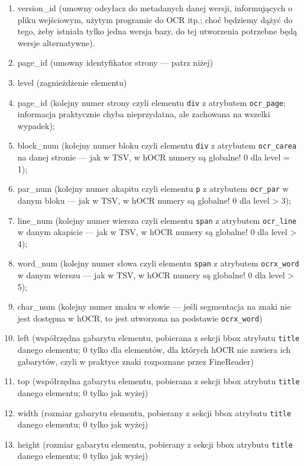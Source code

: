 \documentclass[12]{mwart}
\def\p#1{\textsf{#1}}
\def\f#1{\colorbox{black!15}{\textsf{#1}}}
\begin{document}
\begin{enumerate}
\item \f{version_id} (umowny odsyłacz do metadanych danej wersji,
  informujących o pliku wejściowym, użytym programie do OCR itp.; choć
  będziemy dążyć do tego, żeby istniała tylko jedna wersja bazy, do
  tej utworzenia potrzebne będą wersje alternatywne).
\item \f{page_id} (umowny identyfikator strony --- patrz niżej)
\item \f{level} (zagnieżdżenie elementu)
\item \f{page_id} (kolejny numer strony czyli elementu \texttt{div} z
  atrybutem \texttt{ocr_page}; informacja praktycznie chyba
  nieprzydatna, ale zachowana na wszelki wypadek);
\item \f{block_num} (kolejny numer bloku czyli elementu \texttt{div} z
  atrybutem \texttt{ocr_carea} na danej stronie --- jak w TSV, w hOCR numery są
  globalne! 0 dla level = 1);
\item \f{par_num} (kolejny numer akapitu czyli elementu \texttt{p} z
  atrybutem \texttt{ocr_par} w danym bloku --- jak w TSV, w hOCR numery są
  globalne! 0 dla level > 3);
\item \f{line_num} (kolejny numer wiersza czyli elementu \texttt{span} z
  atrybutem \texttt{ocr_line} w danym akapicie --- jak w TSV, w hOCR numery są
  globalne! 0 dla level > 4);
\item \f{word_num} (kolejny numer słowa czyli elementu \texttt{span} z
  atrybutem \texttt{ocrx_word} w danym wierszu --- jak w TSV, w hOCR numery są
  globalne! 0 dla level > 5);
\item \f{char_num} (kolejny numer znaku w słowie --- jeśli segmentacja na
  znaki nie jest dostępna w hOCR, to jest utworzona na podstawie
  \texttt{ocrx_word})
\item \f{left} (współrzędna gabarytu elementu, pobierana z sekcji
  \textsf{bbox} atrybutu \texttt{title} danego elementu; 0 tylko dla
  elementów, dla których hOCR nie zawiera ich gabarytów, czyli w
  praktyce znaki rozpoznane przez \p{FineReader})
\item \f{top} (współrzędna gabarytu elementu, pobierana z sekcji
  \textsf{bbox} atrybutu \texttt{title} danego elementu; 0 tylko jak wyżej)
\item \f{width} (rozmiar gabarytu elementu, pobierany z sekcji
  \textsf{bbox} atrybutu \texttt{title} danego elementu; 0 tylko jak wyżej)
\item \f{height} (rozmiar gabarytu elementu, pobierany z sekcji
  \textsf{bbox} atrybutu \texttt{title} danego elementu; 0 tylko jak wyżej)

\end{enumerate}
\end{document}
